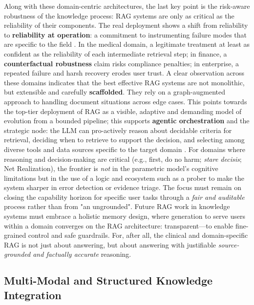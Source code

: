 \documentclass[11pt,a4paper]{article}
\begin{document}
Along with these domain-centric architectures, the last key point is the risk-aware robustness of the knowledge process: RAG systems are only as critical as the reliability of their components. The real deployment shows a shift from reliability to \textbf{reliability at operation}: a commitment to instrumenting failure modes that are specific to the field \cite{arxiv:2401.05856v1}. In the medical domain, a legitimate treatment at least as confident as the reliability of each intermediate retrieval step; in finance, a \textbf{counterfactual robustness} claim risks compliance penalties; in enterprise, a repeated failure and harsh recovery erodes user trust. A clear observation across these domains indicates that the best effective RAG systems are not monolithic, but extensible and carefully \textbf{scaffolded}. They rely on a graph-augmented approach to handling document situations across edge cases. This points towards the top-tier deployment of RAG as a visible, adaptive and demanding model of evolution from a bounded pipeline; this supports \textbf{agentic orchestration} and the strategic node: the LLM can pro-actively reason about decidable criteria for retrieval, deciding when to retrieve to support the decision, and selecting among diverse tools and data sources specific to the target domain \cite{arxiv:2501.09136v4,arxiv:2411.19443v1}. For domains where reasoning and decision-making are critical (e.g., first, do no harm; \emph{stare decisis}; Net Realization), the frontier is \emph{not} in the parametric model's cognitive limitations but in the use of a logic and ecosystem such as a prober to make the system sharper in error detection or evidence triage. The focus must remain on closing the capability horizon for specific user tasks through a \emph{fair and auditable} process rather than from "an ungrounded". Future RAG work in knowledge systems must embrace a holistic memory design, where generation to serve users within a domain converges on the RAG architecture: transparent---to enable fine-grained control and safe guardrails. For, after all, the clinical and domain-specific RAG is not just about answering, but about answering with justifiable \emph{source-grounded and factually accurate} reasoning.


\subsection{Multi-Modal and Structured Knowledge Integration}
\end{document}
